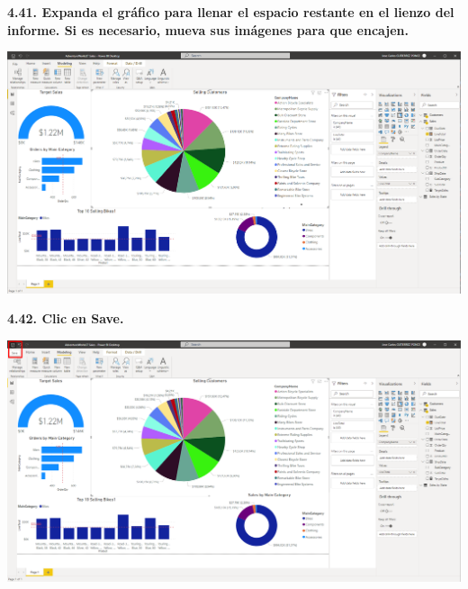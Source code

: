 \documentclass{article}
\begin{document}
\newpage
\textbf{4.41. Expanda el gráfico para llenar el espacio restante en el lienzo del informe. Si es necesario, mueva sus imágenes para que encajen.}

    \begin{center}
		\includegraphics[width=14cm]{./images/117} 
	\end{center}


\textbf{4.42. Clic en \textbf{Save}.}

    \begin{center}
		\includegraphics[width=14cm]{./images/118} 
	\end{center}


	
\end{document}
